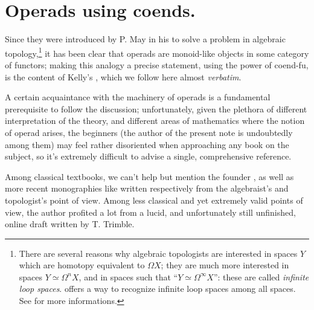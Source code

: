 \section{Operads using coends.}\label{sec:opd}
Since they were introduced by P\@. May in his \cite{may1972geometry} to solve a problem in algebraic topology,\footnote{There are several reasons why algebraic topologists are interested in spaces $Y$ which are homotopy equivalent to $\Omega X$; they are much more interested in spaces $Y\simeq \Omega^n X$, and in spaces such that ``$Y\simeq \Omega^\infty X$'': these are called \emph{infinite loop spaces}. \cite{may1972geometry} offers a way to recognize infinite loop spaces among all spaces. See \cite{adams1978infinite} for more informations.} it has been clear that operads are monoid-like objects in some category of functors; making this analogy a precise statement, using the power of coend-fu, is the content of Kelly's \cite{Kelly2005a}, which we follow here almost \emph{verbatim}.

A certain acquaintance with the machinery of operads is a fundamental prerequisite to follow the discussion; unfortunately, given the plethora of different interpretation of the theory, and different areas of mathematics where the notion of operad arises, the beginners (the author of the present note is undoubtedly among them) may feel rather disoriented when approaching any book on the subject, so it's extremely difficult to advise a single, comprehensive reference. 

Among classical textbooks, we can't help but mention the founder \cite{may1972geometry}, as well as more recent monographies like \cite{loday2012algebraic, markl2007operads} written respectively from the algebraist's and topologist's point of view. Among less classical and yet extremely valid points of view, the author profited a lot from a lucid, and unfortunately still unfinished, online draft \cite{trimblerads} written by T\@. Trimble.

